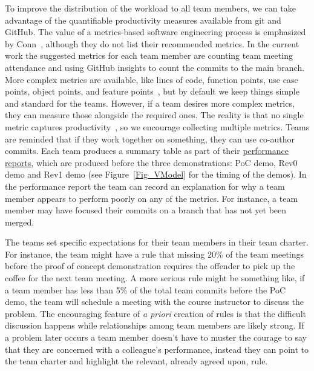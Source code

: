 \documentclass[10pt, conference]{IEEEtran}
\begin{document}
To improve the distribution of the workload to all team members, we can take
advantage of the quantifiable productivity measures available from git and
GitHub.  The value of a metrics-based software engineering process is emphasized
by Conn~\cite{connReusableAcademicstrengthMetricsbased2004}, although they do
not list their recommended metrics.  In the current work the suggested metrics
for each team member are counting team meeting attendance and using GitHub
insights to count the commits to the main branch.  More complex metrics are
available, like lines of code, function points, use case points, object points,
and feature points~\cite{sudhakarMeasuringProductivitySoftware2012}, but by
default we keep things simple and standard for the teams.  However, if a team
desires more complex metrics, they can measure those alongside the required
ones. The reality is that no single metric captures
productivity~\cite{Jaspan2019}, so we encourage collecting multiple metrics.
Teams are reminded that if they work together on something, they can use
co-author commits. Each team produces a summary table as part of their
\href{REDACT LINK}  
{performance reports}, which are produced before the three demonstrations: PoC
demo, Rev0 demo and Rev1 demo (see Figure~\ref{Fig_VModel} for the timing of the
demos). In the performance report the team can record an explanation for why a
team member appears to perform poorly on any of the metrics. For instance, a
team member may have focused their commits on a branch that has not yet been
merged.

The teams set specific expectations for their team members in their team
charter. For instance, the team might have a rule that missing 20\% of the team
meetings before the proof of concept demonstration requires the offender to pick
up the coffee for the next team meeting. A more serious rule might be something
like, if a team member has less than 5\% of the total team commits before the
PoC demo, the team will schedule a meeting with the course instructor to discuss
the problem. The encouraging feature of \textit{a priori} creation of rules is
that the difficult discussion happens while relationships among team members are
likely strong.  If a problem later occurs a team member doesn't have to muster
the courage to say that they are concerned with a colleague's performance,
instead they can point to the team charter and highlight the relevant, already
agreed upon, rule.
\end{document}

